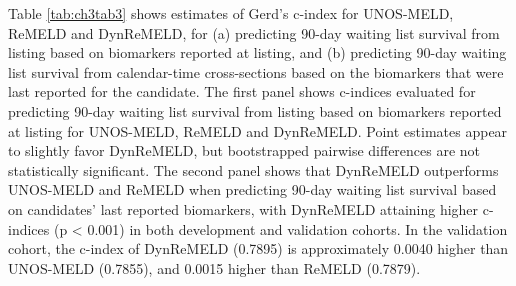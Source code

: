 \documentclass[11pt,twoside,]{book}
\begin{document}
Table \ref{tab:ch3tab3} shows estimates of Gerd's c-index for UNOS-MELD, ReMELD
and DynReMELD, for (a) predicting 90-day waiting list survival from listing
based on biomarkers reported at listing, and (b) predicting 90-day
waiting list survival from calendar-time cross-sections based on the biomarkers
that were last reported for the candidate. The first panel shows c-indices evaluated for predicting 90-day waiting list
survival from listing based on biomarkers reported at listing for
UNOS-MELD, ReMELD and DynReMELD. Point estimates appear to slightly
favor DynReMELD, but bootstrapped pairwise differences are not
statistically significant. The second panel shows that DynReMELD
outperforms UNOS-MELD and ReMELD when predicting 90-day waiting list
survival based on candidates' last reported biomarkers, with DynReMELD
attaining higher c-indices (p \textless{} 0.001) in both development and
validation cohorts. In the validation cohort, the c-index of DynReMELD
(0.7895) is approximately 0.0040 higher than UNOS-MELD (0.7855), and
0.0015 higher than ReMELD (0.7879).

\FloatBarrier

\begingroup
\setlength{\aboverulesep}{0.2ex}
\setlength{\belowrulesep}{0.3ex}
\end{document}
